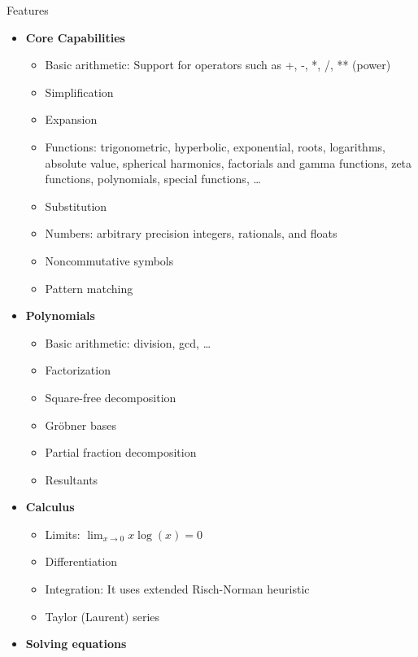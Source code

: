 \documentclass[xcolor=svgnames]{beamer}
\begin{document}
  \begin{frame}{Features}
    \begin{multicols}{2}
      \tiny
      \begin{itemize}
      \item \textbf{Core Capabilities}
        \begin{itemize}
          \tiny
        \item Basic arithmetic: Support for operators such as +, -, *, /, ** (power)
        \item Simplification
        \item Expansion
        \item Functions: trigonometric, hyperbolic, exponential, roots, logarithms,
          absolute value, spherical harmonics, factorials and gamma functions, zeta
          functions, polynomials, special functions, \ldots
        \item Substitution
        \item Numbers: arbitrary precision integers, rationals, and floats
        \item Noncommutative symbols
        \item Pattern matching
        \end{itemize}
      \item \textbf{Polynomials}
        \begin{itemize}
          \tiny
        \item Basic arithmetic: division, gcd, \ldots
        \item Factorization
        \item Square-free decomposition
        \item Gröbner bases
        \item Partial fraction decomposition
        \item Resultants
        \end{itemize}
      \item \textbf{Calculus}
        \begin{itemize}
          \tiny
        \item Limits: $\lim_{x\to 0}{x\log(x)} = 0$
        \item Differentiation
        \item Integration: It uses extended Risch-Norman heuristic
        \item Taylor (Laurent) series
        \end{itemize}
      \item \textbf{Solving equations}
        \begin{itemize}

\end{itemize}
\end{itemize}
\end{multicols}
\end{frame}
\end{document}
